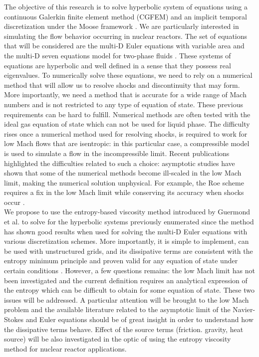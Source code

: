 The objective of this research is to solve hyperbolic system of equations using a continuous Galerkin finite element method (CGFEM) and an implicit temporal discretization under the Moose framework \cite{Moose}. We are particularly interested in simulating the flow behavior occurring in nuclear reactors. The set of equations that will be considered are the multi-D Euler equations with variable area \cite{Toro} and the multi-D seven equations model for two-phase fluids \cite{SEM}. These systems of equations are hyperbolic and well defined in a sense that they possess real eigenvalues. To numerically solve these equations, we need to rely on a numerical method that will allow us to resolve shocks and discontinuity that may form. More importantly, we need a method that is accurate for a wide range of Mach numbers and is not restricted to any type of equation of state. These previous requirements can be hard to fulfill. Numerical methods are often tested with the ideal gas equation of state which can not be used for liquid phase. The difficulty rises once a numerical method used for resolving shocks, is required to work for low Mach flows that are isentropic: in this particular case, a compressible model is used to simulate a flow in the incompressible limit. Recent publications \cite{LowMach1, LowMach2} highlighted the difficulties related to such a choice: asymptotic studies have shown that some of the numerical methods become ill-scaled in the low Mach limit, making the numerical solution unphysical. For example, the Roe scheme requires a fix in the low Mach limit while conserving its accuracy when shocks occur \cite{Roe}. \\
We propose to use the entropy-based viscosity method introduced by Guermond et al. to solve for the hyperbolic systems previously enumerated since the method has shown good results when used for solving the multi-D Euler equations with various discretization schemes. More importantly, it is simple to implement, can be used with unstructured grids,  and its dissipative terms are consistent with the entropy minimum principle and proven valid for any equation of state under certain conditions \cite{jlg}. However, a few questions remains: the low Mach limit has not been investigated and the current definition requires an analytical expression of the entropy which can be difficult to obtain for some equation of state. These two issues will be addressed. A particular attention will be brought to the low Mach problem and the available literature related to the asymptotic limit of the Navier-Stokes \cite{Muller} and Euler equations \cite{LowMach1, LowMach2} should be of great insight in order to understand how the dissipative terms behave. Effect of the source terms (friction. gravity, heat source) will be also investigated in the optic of using the entropy viscosity method for nuclear reactor applications. \\
